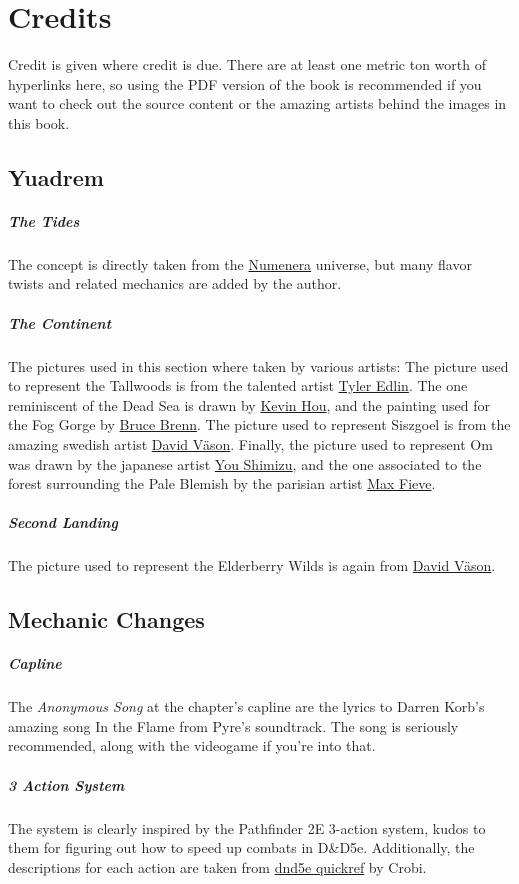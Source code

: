\section{Credits}
\begin{linenumbers}
Credit is given where credit is due.
There are at least one metric ton worth of hyperlinks here, so using the PDF version of the book is recommended if you want to check out the source content or the amazing artists behind the images in this book.

\subsection*{Yuadrem}
\subparagraph{The Tides} The concept is directly taken from the \href{http://numenera.com/}{Numenera} universe, but many flavor twists and related mechanics are added by the author.

\subparagraph{The Continent} The pictures used in this section where taken by various artists:
The picture used to represent the Tallwoods is from the talented artist \href{https://www.artstation.com/tyleredlinart}{Tyler Edlin}.
The one reminiscent of the Dead Sea is drawn by \href{https://www.artstation.com/knightblur}{Kevin Hou}, and the painting used for the Fog Gorge by \href{https://www.artstation.com/brucebrenn}{Bruce Brenn}.
The picture used to represent Siszgoel is from the amazing swedish artist \href{https://www.artstation.com/davidvason}{David V\"ason}.
Finally, the picture used to represent Om was drawn by the japanese artist \href{https://www.pixiv.net/en/users/2830609}{You Shimizu}, and the one associated to the forest surrounding the Pale Blemish by the parisian artist \href{https://www.artstation.com/maxfieve}{Max Fieve}.

\subparagraph{Second Landing} The picture used to represent the Elderberry Wilds is again from \href{https://www.artstation.com/davidvason}{David V\"ason}.

\subsection*{Mechanic Changes}
\subparagraph{Capline} The \textit{Anonymous Song} at the chapter's capline are the lyrics to Darren Korb's amazing song In the Flame from Pyre's soundtrack.
The song is seriously recommended, along with the videogame if you're into that.

\subparagraph{3 Action System} The system is clearly inspired by the Pathfinder 2E 3-action system, kudos to them for figuring out how to speed up combats in D\&D5e.
Additionally, the descriptions for each action are taken from \href{https://crobi.github.io/dnd5e-quickref/}{dnd5e quickref} by Crobi.


\end{linenumbers}
